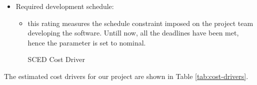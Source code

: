 \begin{itemize}
	\item Required development schedule: 
	\begin{itemize}
	\item[] this rating measures the schedule constraint imposed on the project team developing the software. Untill now, all the deadlines have been met, hence the parameter is set to nominal.
	\begin{costdriverstable}{SCED Cost Driver}
		\hline
	\end{costdriverstable}
	\end{itemize}
\end{itemize}
The estimated cost drivers for our project are shown in Table \ref{tab:cost-drivers}.

